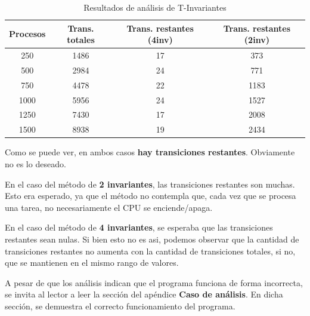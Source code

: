 \documentclass{article}
\begin{document}
    \begin{center}
        \begin{table}[H]
            \centering
            \begin{tabular}{||c|c|c|c||} 
                \hline
                Procesos & Trans. totales & Trans. restantes (4inv) & Trans. restantes (2inv) \\ [0.5ex] 
                \hline\hline
                250 & 1486 & 17 & 373 \\ 
                \hline
                500 & 2984 & 24 & 771 \\
                \hline
                750 & 4478 & 22 & 1183 \\
                \hline
                1000 & 5956 & 24 & 1527 \\
                \hline
                1250 & 7430 & 17 & 2008 \\
                \hline
                1500 & 8938 & 19 & 2434 \\
                \hline
            \end{tabular}
            \caption{Resultados de análisis de T-Invariantes}
        \end{table}
    \end{center} \par
    Como se puede ver, en ambos casos \textbf{hay transiciones restantes}. Obviamente no es
    lo deseado. \par
    En el caso del método de \textbf{2 invariantes}, las transiciones restantes son muchas.
    Esto era esperado, ya que el método no contempla que, cada vez que se procesa una tarea,
    no necesariamente el CPU se enciende/apaga. \par
    En el caso del método de \textbf{4 invariantes}, se esperaba que las transiciones 
    restantes sean nulas. Si bien esto no es asi, podemos observar que la cantidad de 
    transiciones restantes no aumenta con la cantidad de transiciones totales, si no, que se
    mantienen en el mismo rango de valores. \newline \par 
    A pesar de que los análisis indican que el programa funciona de forma incorrecta, se
    invita al lector a leer la sección del apéndice \textbf{Caso de análisis}. En dicha 
    sección, se demuestra el correcto funcionamiento del programa.
\end{document}
